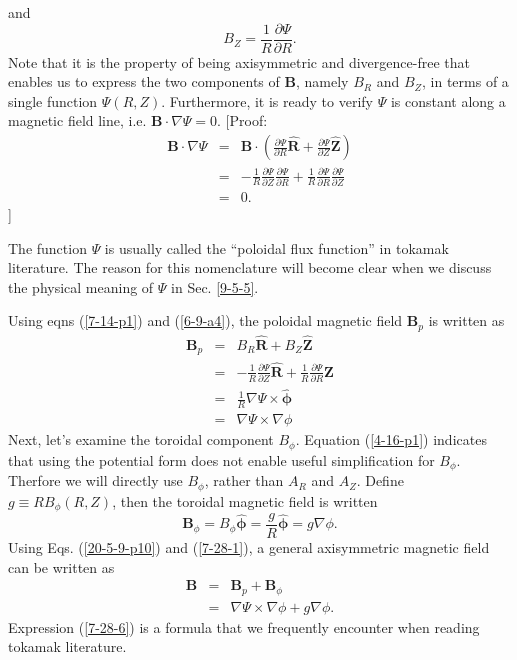 \documentclass{article}
\newcommand{\tmmathbf}[1]{\ensuremath{\boldsymbol{#1}}}
\begin{document}
and
\begin{equation}
  \label{6-9-a4} B_Z = \frac{1}{R} \frac{\partial \Psi}{\partial R} .
\end{equation}
Note that it is the property of being axisymmetric and divergence-free that
enables us to express the two components of $\mathbf{B}$, namely $B_R$ and
$B_Z$, in terms of a single function $\Psi (R, Z)$. Furthermore, it is ready
to verify $\Psi$ is constant along a magnetic field line, i.e. $\mathbf{B}
\cdot \nabla \Psi = 0$. [Proof:
\begin{eqnarray}
  \mathbf{B} \cdot \nabla \Psi & = & \mathbf{B} \cdot \left( \frac{\partial
  \Psi}{\partial R} \hat{\mathbf{R}} + \frac{\partial \Psi}{\partial Z}
  \hat{\mathbf{Z}} \right) \nonumber\\
  & = & - \frac{1}{R} \frac{\partial \Psi}{\partial Z} \frac{\partial
  \Psi}{\partial R} + \frac{1}{R} \frac{\partial \Psi}{\partial R}
  \frac{\partial \Psi}{\partial Z} \nonumber\\
  & = & 0. 
\end{eqnarray}
]

The function $\Psi$ is usually called the ``poloidal flux function'' in
tokamak literature. The reason for this nomenclature will become clear when we
discuss the physical meaning of $\Psi$ in Sec. \ref{9-5-5}.

Using eqns (\ref{7-14-p1}) and (\ref{6-9-a4}), the poloidal magnetic field
$\mathbf{B}_p$ is written as
\begin{eqnarray}
  \mathbf{B}_p & = & B_R \hat{\mathbf{R}} + B_Z \hat{\mathbf{Z}} \nonumber\\
  & = & - \frac{1}{R} \frac{\partial \Psi}{\partial Z} \hat{\mathbf{R}} +
  \frac{1}{R} \frac{\partial \Psi}{\partial R} \hat{\mathbf{Z}} \nonumber\\
  & = & \frac{1}{R} \nabla \Psi \times \hat{\tmmathbf{\phi}} \nonumber\\
  & = & \nabla \Psi \times \nabla \phi  \label{20-5-9-p10}
\end{eqnarray}
Next, let's examine the toroidal component $B_{\phi}$. Equation
(\ref{4-16-p1}) indicates that using the potential form does not enable useful
simplification for $B_{\phi}$. Therfore we will directly use $B_{\phi}$,
rather than $A_R$ and $A_Z$. Define $g \equiv R B_{\phi} (R, Z)$, then the
toroidal magnetic field is written
\begin{equation}
  \label{7-28-1} \mathbf{B}_{\phi} = B_{\phi} \hat{\tmmathbf{\phi}} =
  \frac{g}{R} \hat{\tmmathbf{\phi}} = g \nabla \phi .
\end{equation}
Using Eqs. (\ref{20-5-9-p10}) and (\ref{7-28-1}), a general axisymmetric
magnetic field can be written as
\begin{eqnarray}
  \mathbf{B} & = & \mathbf{B}_p +\mathbf{B}_{\phi} \nonumber\\
  & = & \nabla \Psi \times \nabla \phi + g \nabla \phi .  \label{7-28-6}
\end{eqnarray}
Expression (\ref{7-28-6}) is a formula that we frequently encounter when
reading tokamak literature.
\end{document}
